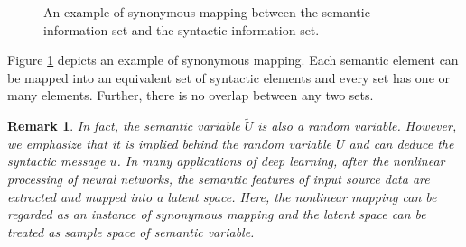 \documentclass[12pt, draftclsnofoot,onecolumn]{IEEEtran}
\newtheorem{remark}{\bf{Remark}}
\begin{document}
\begin{figure}[htbp]
\setlength{\abovecaptionskip}{0.cm}
\setlength{\belowcaptionskip}{-0.cm}
  \caption{An example of synonymous mapping between the semantic information set and the syntactic information set.}\label{Synonymous_mapping}
\end{figure}

Figure \ref{Synonymous_mapping} depicts an example of synonymous mapping. Each semantic element can be mapped into an equivalent set of syntactic elements and every set has one or many elements. Further, there is no overlap between any two sets.

\begin{remark}
In fact, the semantic variable $\tilde{U}$ is also a random variable. However, we emphasize that it is implied behind the random variable $U$ and can deduce the syntactic message $u$. In many applications of deep learning, after the nonlinear processing of neural networks, the semantic features of input source data are extracted and mapped into a latent space. Here, the nonlinear mapping can be regarded as an instance of synonymous mapping and the latent space can be treated as sample space of semantic variable.
\end{remark}
\end{document}
